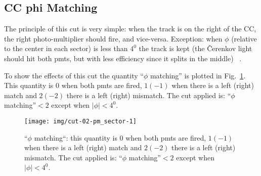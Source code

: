 \clearpage\newpage

\subsection{CC phi Matching}\label{subsec:cc-phi-matching}
The principle of this cut is very simple: when the track is on the right of the CC, the right
photo-multiplier should fire, and vice-versa.
Exception: when $\phi$ (relative to the center in each sector) is less
than $4^0$ the track is kept (the \v Cerenkov light should hit both pmts,
but with less efficiency since it splits in the middle)
~\cite{bib:ccmatch,bib:pc_fxpun,bib:pc_osi}.

To show the effects of this cut the quantity ``$\phi$ matching'' is plotted in
Fig.~\ref{fig:ccm_phi}.
This quantity is $0$ when both pmts are fired, $1(-1)$ when
there is a left (right) match and $2(-2)$ there is a left (right) mismatch.
The cut applied is: ``$\phi$ matching''$<2$ except when $|\phi|<4^0$.

\begin{figure}[ht]
    \centering
    \texttt{[image: img/cut-02-pm\_sector-1]}
    \caption{``$\phi$ matching``: this quantity is $0$ when both pmts are fired, $1(-1)$ when
    there is a left (right) match and $2(-2)$ there is a left (right) mismatch.
    The cut applied is: ``$\phi$ matching''$<2$ except when $|\phi|<4^0$.}
    \label{fig:ccm_phi}
\end{figure}

